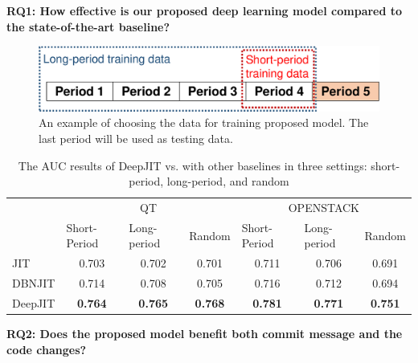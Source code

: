 \noindent \textbf{RQ1: How effective is our proposed deep learning model compared to the state-of-the-art baseline?}

\begin{figure}
\center
\includegraphics[scale=0.36]{figs/split.pdf}
\caption{An example of choosing the data for training proposed model. The last period will be used as testing data.}
\label{fig:splitting}
\end{figure}

\begin{table}[t!]
  \centering
  \caption{The AUC results of DeepJIT vs. with other baselines in three settings: short-period, long-period, and random}
    \begin{tabular}{|l|c|c|c|c|c|c|}
    \hline
    \multirow{2}[4]{*}{} & \multicolumn{3}{c|}{QT} & \multicolumn{3}{c|}{OPENSTACK} \\
\cline{2-7}          & \multicolumn{1}{l|}{Short-Period} & \multicolumn{1}{l|}{Long-period} & \multicolumn{1}{l|}{Random} & \multicolumn{1}{l|}{Short-Period} & \multicolumn{1}{l|}{Long-period} & \multicolumn{1}{l|}{Random} \\
    \hline
    \hline
    JIT   & 0.703 & 0.702 & 0.701 & 0.711 & 0.706 & 0.691 \\
    \hline
    DBNJIT & 0.714 & 0.708 & 0.705 & 0.716 & 0.712 & 0.694 \\
    \hline
    DeepJIT & \textbf{0.764} & \textbf{0.765} & \textbf{0.768} & \textbf{0.781} & \textbf{0.771} & \textbf{0.751} \\
    \hline
    \end{tabular}%
  \label{tab:results}%
\end{table}%

\noindent \textbf{RQ2: Does the proposed model benefit both commit message and the code changes?}

